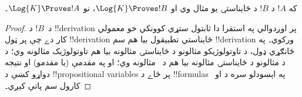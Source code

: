 \documentclass[../../../include/open-logic-section]{subfiles}
\begin{document}
\begin{prop}
  که $!A$ د $!B$ د ځايناستۍ يو مثال وي او $\Log{K} \Proves !B$،
  نو $\Log{K} \Proves !A$۔
\end{prop}

\begin{proof}
  د~$!B$ د !!{derivation} پر اوږدوالي په استقرا دا ثابتول ستړي
  کوونکي خو معمولي کار دے چې پر ټول !!{derivation} ځايناستي تطبيقول
  بيا هم سم !!{derivation} ورکوي۔ په ځانګړي ډول، د تاوتولوژيکو
  مثالونو د ځايناستۍ مثالونه بيا هم تاوتولوژيک مثالونه وي؛ د
   د مثالونو د ځايناستۍ مثالونه
  بيا هم د~ مثالونه وي؛ او په مقدمې (يا مقدمو) او نتيجه دواړو کښې
  د !!{propositional variable}s پر ځاے د !!{formula}s په اېښودلو سره
  د \MP{} او~\Nec{} کارول سم پاتې کېږي۔
\end{proof}
\end{document}

